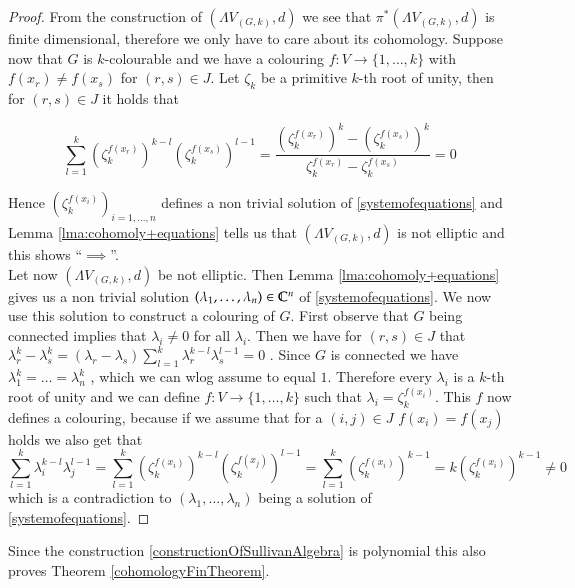  \begin{proof}
  From the construction of $(\Lambda V_{(G,k)},d)$ we see that  $\pi^*(\Lambda V_{(G,k)},d)$ is finite dimensional, therefore
  we only have to care about its cohomology. Suppose now that $G$ is $k$-colourable and we have a colouring
  $f \colon V \to { \lbrace 1, \dotsc , k \rbrace }$ with $f(x_r) \neq f(x_s)$ for $(r,s) \in J$. Let $\zeta_k$ be a primitive 
  $k$-th root of unity, then for $(r,s) \in J$ it holds that
  
  $$ \sum_{l = 1}^k (\zeta_k^{f(x_r)})^{k-l} (\zeta_k^{f(x_s)})^{l-1}
  = \frac{(\zeta_k^{f(x_r)})^{k} - (\zeta_k^{f(x_s)})^{k}}{ \zeta_k^{f(x_r)} - \zeta_k^{f(x_s)}} = 0
  $$
  
  Hence $(\zeta_k^{f(x_i)})_{i = 1, \dotsc, n}$ defines a non trivial solution of \ref{systemofequations}
  and Lemma \ref{lma:cohomoly+equations} tells us that $(\Lambda V_{(G,k)},d)$ is not elliptic and this shows
  ``$\implies$''. \\
  Let now $(\Lambda V_{(G,k)},d)$ be not elliptic. Then Lemma \ref{lma:cohomoly+equations} gives us a non trivial
  solution $(\lambda_1 , \dotsc, \lambda_n) \in \mathbb{C}^n$ of \ref{systemofequations}. We now use this solution to construct
  a colouring of $G$. First observe that $G$ being connected implies that $\lambda_i \neq 0$ for all $\lambda_i$. Then we have
  for $(r,s) \in J$ that $ \lambda_r^k - \lambda_s^k = ( \lambda_r - \lambda_s) 
  \sum_{l = 1}^k \lambda_r^{k - l} \lambda_s^{l - 1} = 0$ . Since $G$ is connected we have 
  $\lambda_1^k = \dotsc = \lambda_n^k$ , which we can wlog assume to equal $1$. Therefore every $\lambda_i$ is a 
  $k$-th root of unity and we can define $f \colon V \to { \lbrace 1, \dotsc , k \rbrace }$ such that 
  $\lambda_i = \zeta_k^{f(x_i)}$. This $f$ now defines a colouring, because if we assume that for a $(i,j) \in J$
  $f(x_i) = f(x_j)$ holds we also get that 
  $$\sum_{l = 1}^k \lambda_i^{k - l} \lambda_j^{l - 1} = \sum_{l = 1}^k (\zeta_k^{f(x_i)})^{k-l} (\zeta_k^{f(x_j)})^{l-1}
  = \sum_{l = 1}^k (\zeta_k^{f(x_i)})^{k-1} = k (\zeta_k^{f(x_i)})^{k-1} \neq 0$$ 
  which is a contradiction to $(\lambda_1 , \dotsc, \lambda_n)$ being a solution of \ref{systemofequations}.
  
 \end{proof}

 Since the construction \ref{constructionOfSullivanAlgebra} is polynomial this also proves Theorem \ref{cohomologyFinTheorem}.
